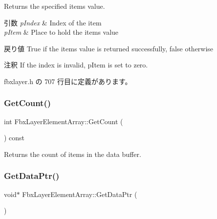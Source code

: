 Returns the specified item\textquotesingle{}s value. 
\begin{DoxyParams}{引数}
{\em p\+Index} & Index of the item \\
\hline
{\em p\+Item} & Place to hold the item\textquotesingle{}s value \\
\hline
\end{DoxyParams}
\begin{DoxyReturn}{戻り値}
{\ttfamily True} if the item\textquotesingle{}s value is returned successfully, {\ttfamily false} otherwise 
\end{DoxyReturn}
\begin{DoxyRemark}{注釈}
If the index is invalid, p\+Item is set to zero. 
\end{DoxyRemark}


 fbxlayer.\+h の 707 行目に定義があります。

\mbox{\label{class_fbx_layer_element_array_acd195095246f6d886d55fd0aa7129b2d}} 
\subsubsection{\texorpdfstring{Get\+Count()}{GetCount()}}
{\footnotesize\ttfamily int Fbx\+Layer\+Element\+Array\+::\+Get\+Count (\begin{DoxyParamCaption}{ }\end{DoxyParamCaption}) const}



Returns the count of items in the data buffer. 

\mbox{\label{class_fbx_layer_element_array_a5bd7bc19029950341e907616172ceefd}} 
\subsubsection{\texorpdfstring{Get\+Data\+Ptr()}{GetDataPtr()}}
{\footnotesize\ttfamily void$\ast$ Fbx\+Layer\+Element\+Array\+::\+Get\+Data\+Ptr (\begin{DoxyParamCaption}{ }\end{DoxyParamCaption})\hspace{0.3cm}{\ttfamily [protected]}}

